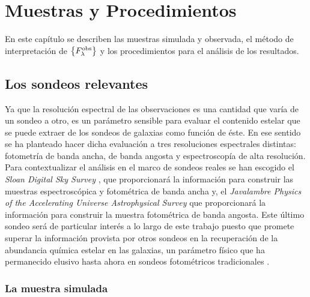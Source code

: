 \chapter{Muestras y Procedimientos}

\label{ch:samples-procedure}

En este capítulo se describen las muestras simulada y observada, el método de interpretación de
$\set{\sedt[F]{obs}}$ y los procedimientos para el análisis de los resultados.


\section{Los sondeos relevantes}

Ya que la resolución espectral de las observaciones es una cantidad que varía de un sondeo a otro,
es un parámetro sensible para evaluar el contenido estelar que se puede extraer de los sondeos de
galaxias como función de éste. En ese sentido se ha planteado hacer dicha evaluación a tres
resoluciones espectrales distintas: fotometría de banda ancha, de banda angosta y espectroscopía de
alta resolución. Para contextualizar el análisis en el marco de sondeos reales se han escogido el
\emph{Sloan Digital Sky Survey} \citep[SDSS,][]{York2000}, que proporcionará la información para
construir las muestras espectroscópica \citep{Strauss2002} y fotométrica de banda ancha
\citep{Gunn1998} y, el \emph{Javalambre Physics of the Accelerating Universe Astrophysical Survey}
\citep[J-PAS,][]{Benitez2014,Dupke2015} que proporcionará la información para construir la muestra
fotométrica de banda angosta. Este último sondeo será de particular interés a lo largo de este
trabajo puesto que promete superar la información provista por otros sondeos en la recuperación de
la abundancia química estelar en las galaxias, un parámetro físico que ha permanecido elusivo hasta
ahora en sondeos fotométricos tradicionales \citep[aún así véase,][]{MacArthur2010}.

\subsection{La muestra simulada}\label{sc:mock-sample}

